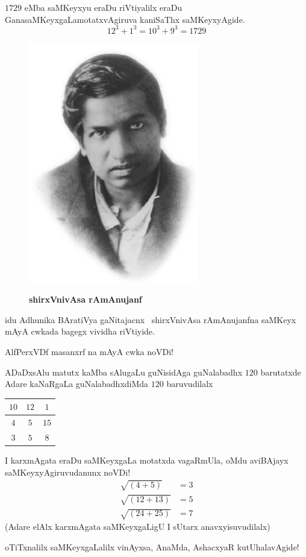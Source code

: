 $1729$ eMba saMKeyxyu eraDu riVtiyalilx eraDu GanasaMKeyxgaLa\break motatxvAgiruva kaniSaThx saMKeyxyAgide.
$$
12^3 + 1^3 =10^3 + 9 ^3 = 1729
$$
\begin{figure}[H]
\centering\includegraphics[scale=0.8]{src/figures/Ramanujan.eps}

{\bf shirxVnivAsa rAmAnujanf}
\end{figure}
idu Adhunika BAratiVya gaNitajacnx~ shirxVnivAsa rAmAnujanfna saMKeyx mAyA cwkada bagegx vividha riVtiyide.

AlfPerxVDf  masanxrf na mAyA cwka noVDi!

ADaDxsAlu matutx kaMba sAlugaLu guNisidAga guNalabadhx $120$ barutatxde Adare kaNaRgaLa guNalabadhxdiMda $120$ baruvudilalx
\begin{center}
\begin{tabular}{|c|c|c|}
\hline
$10$ & $12$ & $1$\\
\hline
$4$ & $5$ & $15$\\
\hline
$3$ & $5$ & $8$\\
\hline
\end{tabular}
\end{center}

I karxmAgata eraDu saMKeyxgaLa motatxda vagaRmUla, oMdu aviBAjayx saMKeyxyAgiruvudanunx noVDi!
\begin{align*}
  \sqrt{(4+5)} & = 3\\
  \sqrt{(12+13)} & = 5\\
  \sqrt{(24+25)} &= 7
\end{align*}
(Adare elAlx karxmAgata saMKeyxgaLigU I sUtarx anavxyisuvudilalx)

oTiTxnalilx saMKeyxgaLalilx vinAyxsa, AnaMda, AshacxyaR kutUhalavAgide! 



